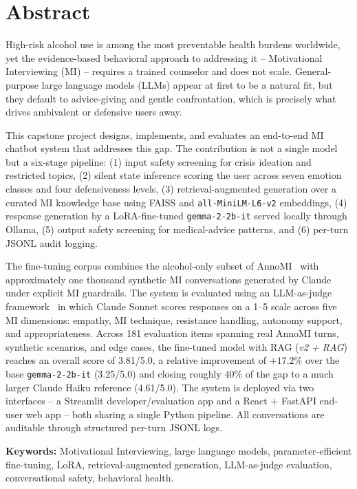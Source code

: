 \section*{Abstract}

High-risk alcohol use is among the most preventable health burdens worldwide, yet
the evidence-based behavioral approach to addressing it -- Motivational Interviewing
(MI) -- requires a trained counselor and does not scale. General-purpose large
language models (LLMs) appear at first to be a natural fit, but they default to
advice-giving and gentle confrontation, which is precisely what drives ambivalent
or defensive users away.

This capstone project designs, implements, and evaluates an end-to-end MI
chatbot system that addresses this gap. The contribution is not a single model
but a six-stage pipeline:
(1) input safety screening for crisis ideation and restricted topics,
(2) silent state inference scoring the user across seven emotion classes and
four defensiveness levels,
(3) retrieval-augmented generation over a curated MI knowledge base using FAISS
and \texttt{all-MiniLM-L6-v2} embeddings,
(4) response generation by a LoRA-fine-tuned \texttt{gemma-2-2b-it} served
locally through Ollama,
(5) output safety screening for medical-advice patterns, and
(6) per-turn JSONL audit logging.

The fine-tuning corpus combines the alcohol-only subset of AnnoMI~\cite{wu2022annomi}
with approximately one thousand synthetic MI conversations generated by Claude
under explicit MI guardrails. The system is evaluated using an LLM-as-judge
framework~\cite{zheng2023judging} in which Claude Sonnet scores responses on a
1--5 scale across five MI dimensions: empathy, MI technique, resistance handling,
autonomy support, and appropriateness. Across 181 evaluation items spanning real
AnnoMI turns, synthetic scenarios, and edge cases, the fine-tuned model with
RAG (\textit{v2 + RAG}) reaches an overall score of 3.81/5.0, a relative
improvement of $+17.2\%$ over the base \texttt{gemma-2-2b-it} (3.25/5.0) and
closing roughly $40\%$ of the gap to a much larger Claude Haiku reference
(4.61/5.0). The system is deployed via two interfaces -- a Streamlit
developer/evaluation app and a React + FastAPI end-user web app -- both sharing
a single Python pipeline. All conversations are auditable through structured
per-turn JSONL logs.

\noindent\textbf{Keywords:} Motivational Interviewing, large language models,
parameter-efficient fine-tuning, LoRA, retrieval-augmented generation,
LLM-as-judge evaluation, conversational safety, behavioral health.
